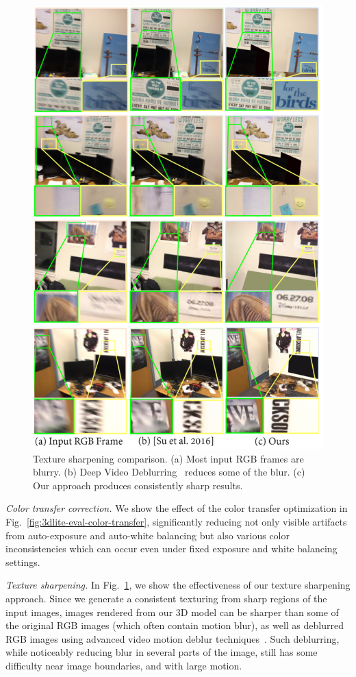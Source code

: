 \begin{figure}
\centering
\includegraphics[width=\linewidth,height=1.2\linewidth]{3dlite/fig19.png}
\caption{Texture sharpening comparison. (a) Most input RGB frames are blurry. (b) Deep Video Deblurring~\cite{su2016deep} reduces some of the blur. (c) Our approach produces consistently sharp results.}
\label{fig:3dlite-eval-deblur}
\end{figure}

\emph{Color transfer correction.}
We show the effect of the color transfer optimization in Fig.~\ref{fig:3dlite-eval-color-transfer}, significantly reducing not only visible artifacts from auto-exposure and auto-white balancing but also various color inconsistencies which can occur even under fixed exposure and white balancing settings.

\emph{Texture sharpening.}
In Fig.~\ref{fig:3dlite-eval-deblur}, we show the effectiveness of our texture sharpening approach.
Since we generate a consistent texturing from sharp regions of the input images, images rendered from our 3D model can be sharper than some of the original RGB images (which often contain motion blur), as well as deblurred RGB images using advanced video motion deblur techniques~\cite{su2016deep}.
Such deblurring, while noticeably reducing blur in several parts of the image, still has some difficulty near image boundaries, and with large motion.

